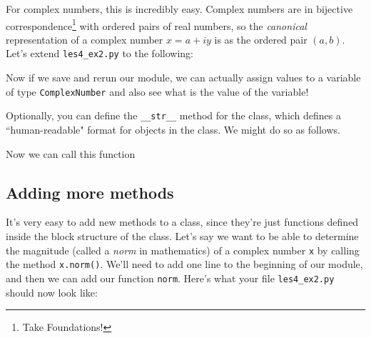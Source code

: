 \documentclass[m3380-lec-main.tex]{subfiles}
\begin{document}
For complex numbers, this is incredibly easy. Complex numbers are in bijective correspondence\footnote{Take Foundations!} with ordered pairs of real numbers, so the \emph{canonical} representation of a complex number $x=a+iy$ is as the ordered pair $(a,b)$. Let's extend \verb|les4_ex2.py| to the following:

\smallskip\noindent
Now if we save and rerun our module, we can actually assign values to a variable of type \verb|ComplexNumber| and also see what is the value of the variable!

\smallskip\noindent

Optionally, you can define the \verb|__str__| method for the class, which defines a ``human-readable" format for objects in the class. We might do so as follows.

\smallskip\noindent

Now we can call this function 

\subsection{Adding more methods}
It's very easy to add new methods to a class, since they're just functions defined inside the block structure of the class. Let's say we want to be able to determine the magnitude (called a \emph{norm} in mathematics) of a complex number \verb|x| by calling the method \verb|x.norm()|. We'll need to add one line to the beginning of our module, and then we can add our function \verb|norm|. Here's what your file \verb|les4_ex2.py| should now look like:
\end{document}

